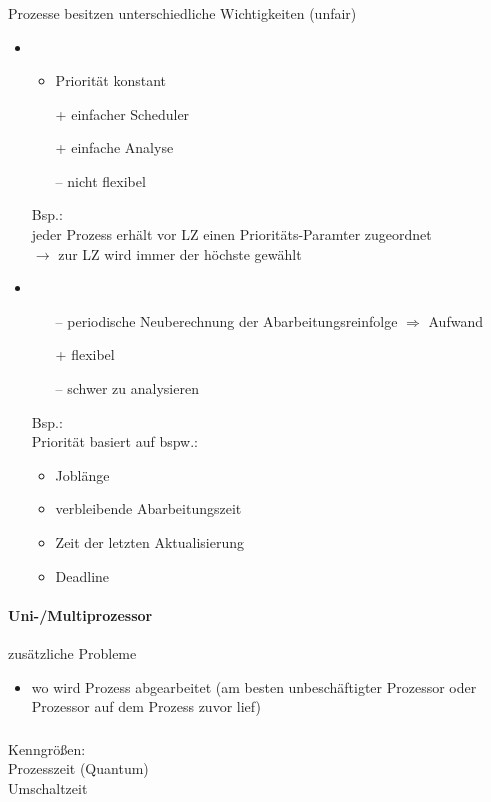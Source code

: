 \subsubsection[Priorisierung]{}
Prozesse besitzen unterschiedliche Wichtigkeiten (unfair)
\begin{itemize}
\item {}
\begin{itemize}
\item Priorität konstant
\item[+] einfacher Scheduler
\item[+] einfache Analyse
\item[--] nicht flexibel
\end{itemize}
Bsp.: \\
jeder Prozess erhält vor LZ einen Prioritäts-Paramter zugeordnet\\
$\to$ zur LZ wird immer der höchste gewählt
\item {}
\begin{itemize}
\item[--] periodische Neuberechnung der Abarbeitungsreinfolge $\Rightarrow$ Aufwand
\item[+] flexibel
\item[--] schwer zu analysieren
\end{itemize}
Bsp.: \\
Priorität basiert auf bspw.:
\begin{itemize}
\item Joblänge
\item verbleibende Abarbeitungszeit
\item Zeit der letzten Aktualisierung
\item Deadline
\end{itemize}
\end{itemize}

\paragraph{Uni-/Multiprozessor} zusätzliche Probleme
\begin{itemize}
\item wo wird Prozess abgearbeitet (am besten unbeschäftigter Prozessor oder Prozessor auf dem Prozess zuvor lief)
\end{itemize}

\subsubsection[Round-Robin]{}
Kenngrößen:\\
 \quad Prozesszeit (Quantum)\\
 \quad Umschaltzeit

